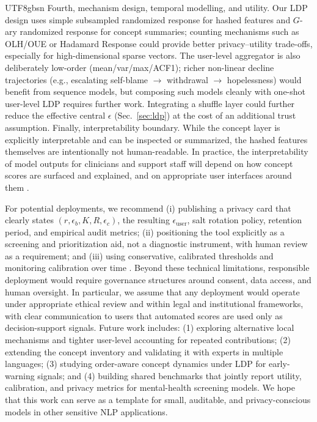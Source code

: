 \documentclass[lettersize,journal]{IEEEtran}
\begin{document}
\begin{CJK*}{UTF8}{gbsn}
Fourth, mechanism design, temporal modelling, and utility. Our LDP design uses simple subsampled randomized response for hashed features and $G$-ary randomized response for concept summaries; counting mechanisms such as OLH/OUE or Hadamard Response \cite{wang2017ldp,acharya2019hr} could provide better privacy--utility trade-offs, especially for high-dimensional sparse vectors. The user-level aggregator is also deliberately low-order (mean/var/max/ACF1); richer non-linear decline trajectories (e.g., escalating self-blame $\rightarrow$ withdrawal $\rightarrow$ hopelessness) would benefit from sequence models, but composing such models cleanly with one-shot user-level LDP requires further work. Integrating a shuffle layer \cite{balle2019shuffle,erlingsson2019shuffle,bittau2017prochlo} could further reduce the effective central $\epsilon$ (Sec.~\ref{sec:ldp}) at the cost of an additional trust assumption.
Finally, interpretability boundary. While the concept layer is explicitly interpretable and can be inspected or summarized, the hashed features themselves are intentionally not human-readable. In practice, the interpretability of model outputs for clinicians and support staff will depend on how concept scores are surfaced and explained, and on appropriate user interfaces around them \cite{koh2020concept}.

For potential deployments, we recommend (i) publishing a privacy card that clearly states $(r,\epsilon_b,K,R,\epsilon_c)$, the resulting $\epsilon_{\text{user}}$, salt rotation policy, retention period, and empirical audit metrics; (ii) positioning the tool explicitly as a screening and prioritization aid, not a diagnostic instrument, with human review as a requirement; and (iii) using conservative, calibrated thresholds and monitoring calibration over time \cite{guo2017calibration}. Beyond these technical limitations, responsible deployment would require governance structures around consent, data access, and human oversight. In particular, we assume that any deployment would operate under appropriate ethical review and within legal and institutional frameworks, with clear communication to users that automated scores are used only as decision-support signals. Future work includes: (1) exploring alternative local mechanisms and tighter user-level accounting for repeated contributions; (2) extending the concept inventory and validating it with experts in multiple languages; (3) studying order-aware concept dynamics under LDP for early-warning signals; and (4) building shared benchmarks that jointly report utility, calibration, and privacy metrics for mental-health screening models. We hope that this work can serve as a template for small, auditable, and privacy-conscious models in other sensitive NLP applications.



\end{CJK*}
\end{document}
